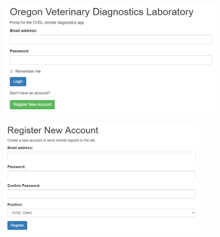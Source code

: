 \documentclass[onecolumn, draftclsnofoot,10pt, compsoc]{IEEEtran}
\begin{document}
\begin{center}
    \includegraphics[height=6cm]{login_web.png}
\end{center}

\begin{center}
\includegraphics[height=6cm]{register_web.png}
\end{center}
\end{document}

